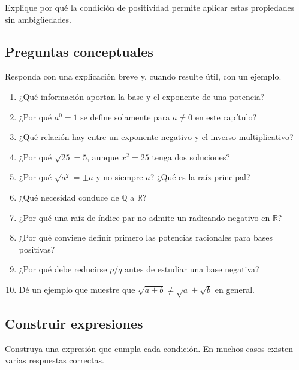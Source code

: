 Explique por qué la condición de positividad permite aplicar estas propiedades sin ambigüedades.

\subsection*{Preguntas conceptuales}

Responda con una explicación breve y, cuando resulte útil, con un ejemplo.

\begin{enumerate}
\item ¿Qué información aportan la base y el exponente de una potencia?
\item ¿Por qué \(a^0=1\) se define solamente para \(a\ne0\) en este capítulo?
\item ¿Qué relación hay entre un exponente negativo y el inverso multiplicativo?
\item ¿Por qué \(\sqrt{25}=5\), aunque \(x^2=25\) tenga dos soluciones?
\item ¿Por qué \(\sqrt{a^2}=\pm a\) y no siempre \(a\)? ¿Qué es la raíz principal?
\item ¿Qué necesidad conduce de \(\mathbb Q\) a \(\mathbb R\)?
\item ¿Por qué una raíz de índice par no admite un radicando negativo en \(\mathbb R\)?
\item ¿Por qué conviene definir primero las potencias racionales para bases positivas?
\item ¿Por qué debe reducirse \(p/q\) antes de estudiar una base negativa?
\item Dé un ejemplo que muestre que \(\sqrt{a+b}\ne\sqrt a+\sqrt b\) en general.
\end{enumerate}

\subsection*{Construir expresiones}

Construya una expresión que cumpla cada condición. En muchos casos existen varias respuestas correctas.

